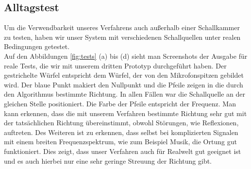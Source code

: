\subsection{Alltagstest} 
Um die Verwendbarkeit unseres Verfahrens auch außerhalb einer Schallkammer zu testen, haben wir unser System mit verschiedenen Schallquellen unter realen Bedingungen getestet.\\
Auf den Abbildungen \ref{fig:tests} (a) bis (d) sieht man Screenshots der Ausgabe für reale Tests, die wir mit unserem dritten Prototyp durchgeführt haben. Der gestrichelte Würfel entspricht dem Würfel, der von den Mikrofonspitzen gebildet wird. Der blaue Punkt makiert den Nullpunkt und die Pfeile zeigen in die durch den Algorithmus bestimmte Richtung. In allen Fällen war die Schallquelle an der gleichen Stelle positioniert. Die Farbe der Pfeile entspricht der Frequenz. Man kann erkennen, dass die mit unserem Verfahren bestimmte Richtung sehr gut mit der tatsächlichen Richtung übereinstimmt, obwohl Störungen, wie Reflexionen, auftreten. Des Weiteren ist zu erkennen, dass selbst bei komplizierten Signalen mit einem breiten Frequenzspektrum, wie zum Beispiel Musik, die Ortung gut funktioniert. Dies zeigt, dass unser Verfahren auch für Realwelt gut geeignet ist und es auch hierbei nur eine sehr geringe Streuung der Richtung gibt.
